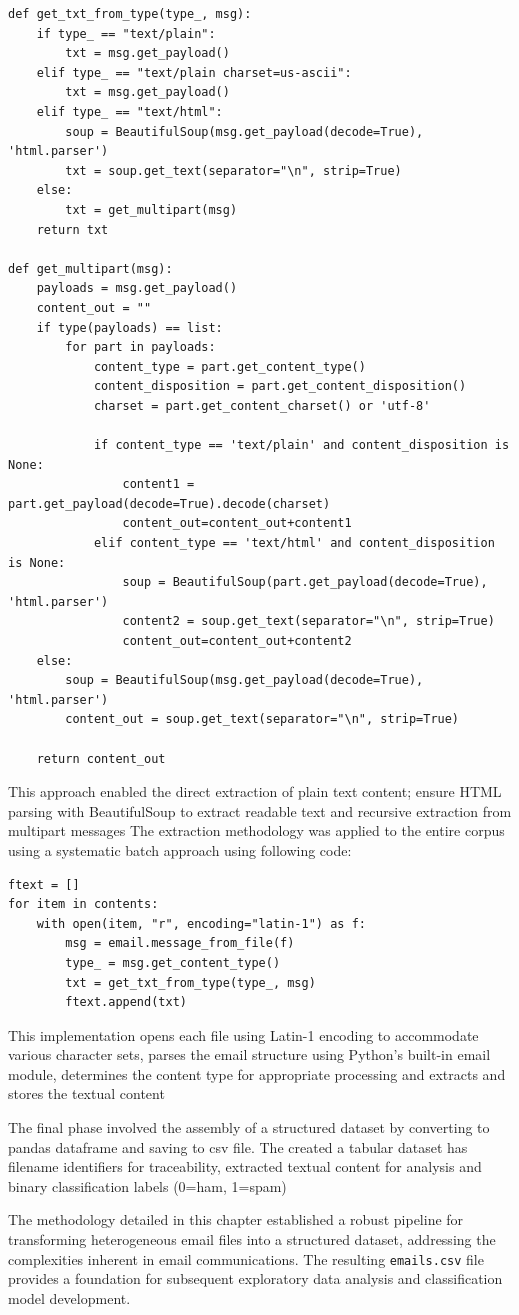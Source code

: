 \begin{verbatim}
def get_txt_from_type(type_, msg):
    if type_ == "text/plain":
        txt = msg.get_payload()
    elif type_ == "text/plain charset=us-ascii":
        txt = msg.get_payload()
    elif type_ == "text/html":
        soup = BeautifulSoup(msg.get_payload(decode=True), 'html.parser')
        txt = soup.get_text(separator="\n", strip=True)
    else:
        txt = get_multipart(msg)
    return txt

def get_multipart(msg):
    payloads = msg.get_payload()
    content_out = ""
    if type(payloads) == list:
        for part in payloads:
            content_type = part.get_content_type()
            content_disposition = part.get_content_disposition()
            charset = part.get_content_charset() or 'utf-8'
            
            if content_type == 'text/plain' and content_disposition is None:
                content1 = part.get_payload(decode=True).decode(charset)
                content_out=content_out+content1
            elif content_type == 'text/html' and content_disposition is None:
                soup = BeautifulSoup(part.get_payload(decode=True), 'html.parser')
                content2 = soup.get_text(separator="\n", strip=True)
                content_out=content_out+content2
    else:
        soup = BeautifulSoup(msg.get_payload(decode=True), 'html.parser')
        content_out = soup.get_text(separator="\n", strip=True)
        
    return content_out
\end{verbatim}

This approach enabled the direct extraction of plain text content; ensure HTML parsing with BeautifulSoup to extract readable text
and recursive extraction from multipart messages
The extraction methodology was applied to the entire corpus using a systematic batch approach using following code:

\begin{verbatim}
ftext = []
for item in contents:
    with open(item, "r", encoding="latin-1") as f:
        msg = email.message_from_file(f)
        type_ = msg.get_content_type()
        txt = get_txt_from_type(type_, msg)
        ftext.append(txt)
\end{verbatim}

This implementation opens each file using Latin-1 encoding to accommodate various character sets, parses the email structure using Python's built-in email module, determines the content type for appropriate processing and extracts and stores the textual content

The final phase involved the assembly of a structured dataset by converting to pandas dataframe and saving to csv file.
The created a tabular dataset has filename identifiers for traceability, extracted textual content for analysis and binary classification labels (0=ham, 1=spam)

The methodology detailed in this chapter established a robust pipeline for transforming heterogeneous email files into a structured dataset, addressing the complexities inherent in email communications. The resulting \texttt{emails.csv} file provides a foundation for subsequent exploratory data analysis and classification model development. 
